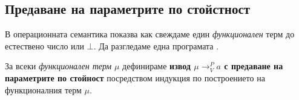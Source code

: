 \subsection{Предаване на параметрите по стойстност}


В операционната семантика показва как свеждаме един {\em функционален} терм до естествено число или $\bot$.
Да разгледаме една програмата .

За всеки {\em функционален терм} $\mu$ дефинираме {\bf извод $\mu \to^P_V a$ с предаване на параметрите по стойност}
посредством индукция по построението на функционалния терм $\mu$.
